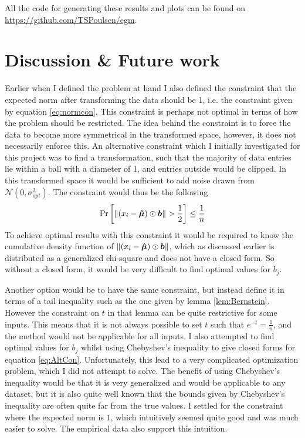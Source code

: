 \documentclass[a4paper,12pt]{article}
\begin{document}
\noindent All the code for generating these results and plots can be found on \url{https://github.com/TSPoulsen/egm}.

\newpage
\section{Discussion \& Future work}
Earlier when I defined the problem at hand I also defined the constraint that the expected norm after 
transforming the data should be 1, i.e. the constraint given by equation \eqref{eq:normcon}. 
This constraint is perhaps not optimal in terms of how the problem should be restricted. The idea behind the constraint
is to force the data to become more symmetrical in the transformed space, however, it does not necessarily enforce this. 
An alternative constraint which I initially investigated for this project was to find a transformation, such that the majority of 
data entries lie within a ball with a diameter of 1, and entries outside would be clipped.
In this transformed space it would be sufficient to add noise drawn from
$\mathcal{N}(0, \sigma_{opt}^2)$. The constraint would thus be the following
\begin{equation}
\label{eq:AltCon}
    \Pr\left [ \| (x_i - \bm{\hat{\mu}}) \odot \bm{b} \| > \frac{1}{2} \right] \le \frac{1}{n} 
\end{equation}
To achieve optimal results with this constraint it would be required to know the cumulative density function of $\| (x_i - \bm{\hat{\mu}}) \odot \bm{b} \|$, 
which as discussed earlier is distributed as a generalized chi-square and does not have a closed form. 
So without a closed form, it would be very difficult to find optimal values for $b_j$. 

Another option would be to have the same constraint, but instead define it in terms of a tail inequality such as the one
given by lemma \ref{lem:Bernstein}. However the constraint on $t$ in that lemma can be quite restrictive for some inputs. 
This means that it is not always possible to set $t$ such that $e^{-t} = \frac{1}{n}$, 
and the method would not be applicable for all inputs.
I also attempted to find optimal values for $b_j$ whilst using Chebyshev's inequality to give closed forms for equation \eqref{eq:AltCon}.
Unfortunately, this lead to a very complicated optimization problem, which I did not attempt to solve.
The benefit of using Chebyshev's inequality would be that it is very generalized and would be applicable to any dataset, 
but it is also quite well known that the bounds given by Chebyshev's inequality are often quite far from the true values. 
I settled for the constraint where the expected norm is $1$, which intuitively seemed quite good and was much easier to solve. 
The empirical data also support this intuition. \\
\end{document}
